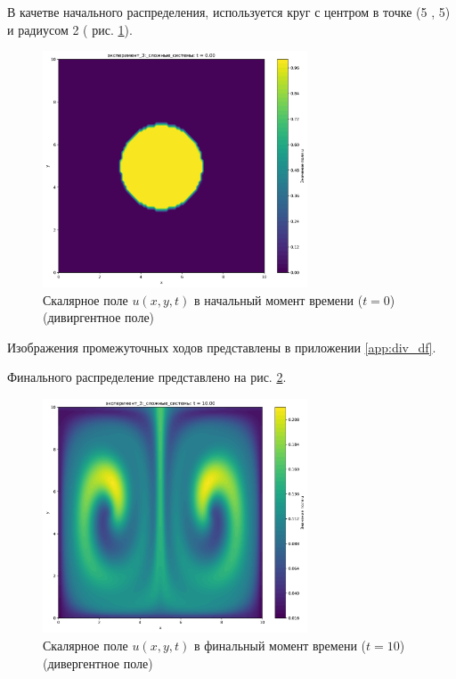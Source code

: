 В качетве начального распределения, используется круг с центром в точке (5 , 5) и радиусом 2 ( рис. \ref{fig:div_begin}).
\begin{figure}
	\centering
	\includegraphics[width=0.7\textwidth]{imgs/эксперимент_3:_сложные_системы_t0.00.png}
	\caption{Скалярное поле \(u(x,y,t)\) в начальный момент времени ($t=0$) (дивиргентное поле)}
	\label{fig:div_begin}
\end{figure}

Изображения промежуточных ходов представлены в приложении \ref{app:div_df}.

Финального распределение представлено на рис. \ref{fig:div_final}.
\begin{figure}
	\centering
	\includegraphics[width=0.7\textwidth]{imgs/эксперимент_3:_сложные_системы_t10.00.png}
	\caption{Скалярное поле \(u(x,y,t)\) в финальный момент времени ($t=10$) (дивергентное поле)}
	\label{fig:div_final}
\end{figure}




